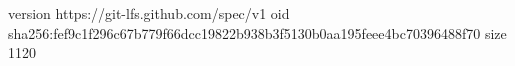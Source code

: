 version https://git-lfs.github.com/spec/v1
oid sha256:fef9c1f296c67b779f66dcc19822b938b3f5130b0aa195feee4bc70396488f70
size 1120
